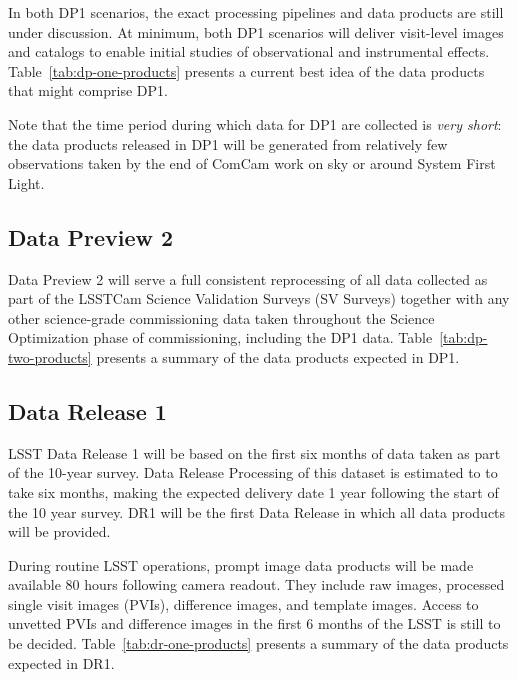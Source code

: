 In both DP1 scenarios, the exact processing pipelines and data products are still under discussion.
At minimum, both DP1 scenarios  will deliver visit-level images and catalogs to enable initial studies of observational and instrumental effects. 
Table~\ref{tab:dp-one-products} presents a current best idea of  the data products that might  comprise DP1. 

Note that the time period during which data for DP1 are collected is \textit{very short}: the data products released in DP1 will be generated from relatively few observations taken by the end of ComCam work on sky or around System First Light.

\subsection{Data Preview 2}
\label{sec:dp2}

Data Preview 2 will serve a full consistent reprocessing of all data collected as part of the LSSTCam Science Validation Surveys (SV Surveys) together with any other science-grade commissioning data taken throughout the Science Optimization phase of commissioning, including the DP1 data. 
Table~\ref{tab:dp-two-products} presents a summary of the data products expected in DP1.

\subsection{Data Release 1}
\label{sec:dr1}

LSST Data Release 1 will be based on the first six months of data taken as part of the 10-year survey. 
Data Release Processing of this dataset is estimated to to take six months, making the expected delivery date 1 year following the start of the 10 year survey. 
DR1 will be the first Data Release in which all data products will be provided. 

During routine LSST operations, prompt image data products will be made available 80 hours following camera readout.
They include raw images, processed single visit images (PVIs), difference images, and template images.
Access to unvetted PVIs and difference images in the first 6 months of the LSST is still to be decided.
Table~\ref{tab:dr-one-products} presents a summary of the data products expected in DR1.

